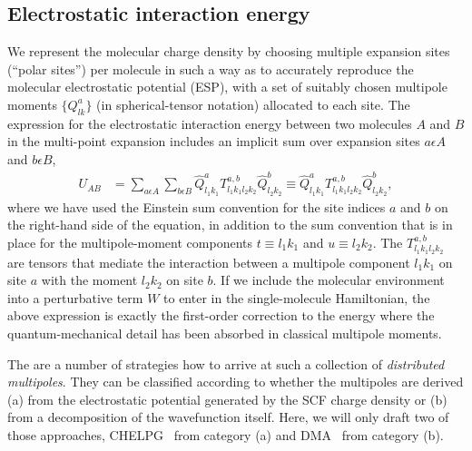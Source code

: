 \subsection{Electrostatic interaction energy}
\label{sec:distributed_multipoles}

We represent the molecular charge density by choosing multiple expansion sites (``polar sites'') per molecule in such a way as to accurately reproduce the molecular electrostatic potential (ESP), with a set of suitably chosen multipole moments $\{Q_{lk}^a\}$ (in spherical-tensor notation) allocated to each site. The expression for the electrostatic interaction energy between two molecules $A$ and $B$ in the multi-point expansion includes an implicit sum over expansion sites $a\epsilon A$ and $b\epsilon B$,
\begin{align}
 U_{AB} & = \sum_{a\epsilon A} \sum_{b\epsilon B} \hat{Q}_{l_1k_1}^a T_{l_1k_1l_2k_2}^{a,b} \hat{Q}_{l_2k_2}^b \equiv  \hat{Q}_{l_1k_1}^a T_{l_1k_1l_2k_2}^{a,b} \hat{Q}_{l_2k_2}^b,
 \label{equ:mol_distributed_U}
\end{align}
where we have used the Einstein sum convention for the site indices $a$ and $b$ on the right-hand side of the equation, in addition to the sum convention that is in place for the multipole-moment components $t\equiv l_1 k_1$ and $u\equiv l_2 k_2$. The $T_{l_1k_1l_2k_2}^{a,b}$ are tensors that mediate the interaction between a multipole component $l_1 k_1$ on site $a$ with the moment $l_2 k_2$ on site $b$. If we include the molecular environment into a perturbative term $W$ to enter in the single-molecule Hamiltonian, the above expression is exactly the first-order correction to the energy where the quantum-mechanical detail has been absorbed in classical multipole moments.

The are a number of strategies how to arrive at such a collection of {\em distributed multipoles}. They can be classified according to whether the multipoles are derived (a) from the electrostatic potential generated by the SCF charge density or (b) from a decomposition of the wavefunction itself. Here, we will only draft two of those approaches, CHELPG~\cite{breneman_determining_1990} from category (a) and DMA~\cite{stone_distributed_1985} from category (b).

